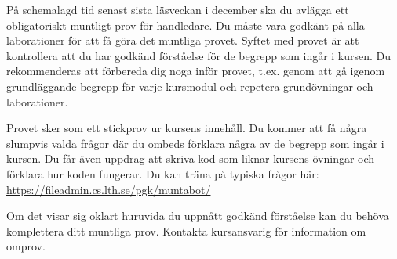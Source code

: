 På schemalagd tid senast sista läsveckan i december ska du avlägga ett obligatoriskt muntligt prov för handledare. Du måste vara godkänt på alla laborationer för att få göra det muntliga provet. Syftet med provet är att kontrollera att du har godkänd förståelse för de begrepp som ingår i kursen. Du rekommenderas att förbereda dig noga inför provet, t.ex. genom att gå igenom grundläggande begrepp för varje kursmodul och repetera grundövningar och laborationer.

Provet sker som ett stickprov ur kursens innehåll. Du kommer att få några slumpvis valda frågor där du ombeds förklara några av de begrepp som ingår i kursen. Du får även uppdrag att skriva kod som liknar kursens övningar och förklara hur koden fungerar. Du kan träna på typiska frågor här: \url{https://fileadmin.cs.lth.se/pgk/muntabot/}

Om det visar sig oklart huruvida du uppnått godkänd förståelse kan du behöva komplettera ditt muntliga prov. Kontakta kursansvarig för information om omprov.  
